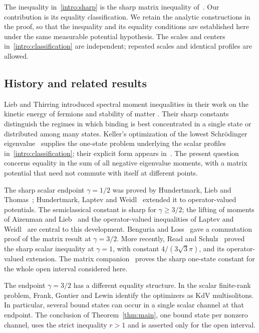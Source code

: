 The inequality in~\eqref{intro:sharp} is the sharp matrix inequality
of~\cite[Theorem~1.1]{MLT}. Our contribution is its equality classification.
We retain the analytic constructions in the proof, so that the inequality
and its equality conditions are established here under the same measurable
potential hypothesis. The scales and centers in~\eqref{intro:classification}
are independent; repeated scales and identical profiles are allowed.

\subsection{History and related results}
Lieb and Thirring introduced spectral moment inequalities in their work
on the kinetic energy of fermions and stability of matter
\cite{LiebThirring1975,LiebThirring1976}. Their sharp constants distinguish
the regimes in which binding is best concentrated in a single state or
distributed among many states. Keller's optimization of the lowest
Schr\"odinger eigenvalue~\cite{Keller1961} supplies the one-state problem
underlying the scalar profiles in~\eqref{intro:classification}; their
explicit form appears in~\cite[Section~4(B), Equations~(4.19)--(4.20)]{LiebThirring1976}.
The present question concerns equality in the sum of all negative
eigenvalue moments, with a matrix potential that need not commute with
itself at different points.

The sharp scalar endpoint $\gamma=1/2$ was proved by
Hundertmark, Lieb and Thomas~\cite{HLT1998}; Hundertmark, Laptev and
Weidl~\cite[Theorem~3.1]{HLW2000} extended it to operator-valued
potentials. The semiclassical constant
is sharp for $\gamma\ge3/2$; the lifting of moments of Aizenman and
Lieb~\cite{AizenmanLieb1978} and the operator-valued inequalities of
Laptev and Weidl~\cite{LaptevWeidl2000} are central to this development.
Benguria and Loss~\cite{BenguriaLoss2000} gave a commutation proof of the
matrix result at $\gamma=3/2$. More recently, Read and
Schulz~\cite{ReadSchulz2026} proved the sharp scalar inequality at
$\gamma=1$, with constant $4/(3\sqrt3\pi)$, and its operator-valued
extension. The matrix companion~\cite{MLT} proves the sharp one-state
constant for the whole open interval considered here.

The endpoint $\gamma=3/2$ has a different equality structure. In the
scalar finite-rank problem, Frank, Gontier and Lewin
\cite[Theorem~5]{FrankGontierLewin2025} identify the optimizers as KdV
multisolitons. In particular, several bound states can occur in a single
scalar channel at that endpoint. The conclusion of
Theorem~\ref{thm:main}, one bound state per nonzero channel, uses the
strict inequality $r>1$ and is asserted only for the open interval.

